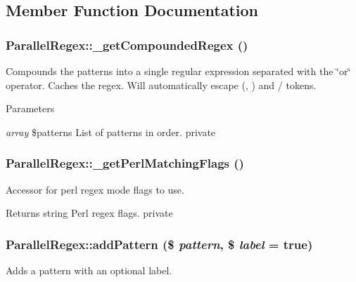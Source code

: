 \subsection{Member Function Documentation}
\hypertarget{class_parallel_regex_a044eace36cdc60c0b26466adc7da62ea}{
\subsubsection[{\_\-getCompoundedRegex}]{\setlength{\rightskip}{0pt plus 5cm}ParallelRegex::\_\-getCompoundedRegex ()}}
\label{class_parallel_regex_a044eace36cdc60c0b26466adc7da62ea}
Compounds the patterns into a single regular expression separated with the \char`\"{}or\char`\"{} operator. Caches the regex. Will automatically escape (, ) and / tokens. 
\begin{DoxyParams}{Parameters}
\item[{\em array}]\$patterns List of patterns in order.  private \end{DoxyParams}
\hypertarget{class_parallel_regex_a23bcc05b9a3a5c2050c3156a3ffc2c52}{
\subsubsection[{\_\-getPerlMatchingFlags}]{\setlength{\rightskip}{0pt plus 5cm}ParallelRegex::\_\-getPerlMatchingFlags ()}}
\label{class_parallel_regex_a23bcc05b9a3a5c2050c3156a3ffc2c52}
Accessor for perl regex mode flags to use. \begin{DoxyReturn}{Returns}
string Perl regex flags.  private 
\end{DoxyReturn}
\hypertarget{class_parallel_regex_a7746a3442c21025ad395300b08d59b4a}{
\subsubsection[{addPattern}]{\setlength{\rightskip}{0pt plus 5cm}ParallelRegex::addPattern (\$ {\em pattern}, \/  \$ {\em label} = {\ttfamily true})}}
\label{class_parallel_regex_a7746a3442c21025ad395300b08d59b4a}
Adds a pattern with an optional label. 

